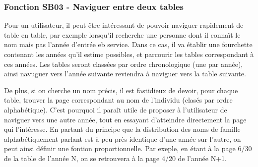 \documentclass[a4paper]{article}
\begin{document}
\subsubsection{Fonction SB03 - Naviguer entre deux tables}

Pour un utilisateur, il peut être intéressant de pouvoir naviguer rapidement de table en table, par exemple lorsqu'il recherche une personne dont il connaït le nom mais pas l'année d'entrée eb service. Dans ce cas, il va établir une fourchette contenant les années qu'il estime possibles, et parcourir les tables correspondant à ces années. Les tables seront classées par ordre chronologique (une par année), ainsi navuguer vers l'année suivante reviendra à naviguer vers la table suivante.

De plus, si on cherche un nom précis, il est fastidieux de devoir, pour chaque table, trouver la page correspondant au nom de l'individu (clasés par ordre alphabétique). C'est pourquoi il paraît utile de proposer à l'utilisateur de naviguer vers une autre année, tout en essayant d'atteindre directement la page qui l'intéresse. En partant du principe que la distribution des noms de famille alphabétiquement parlant est à peu près identique d'une année sur l'autre, on peut ainsi définir une fontion proportionnelle. Par exeple, en étant à la page 6/30 de la table de l'année N, on se retrouvera à la page 4/20 de l'année N+1.
\end{document}
